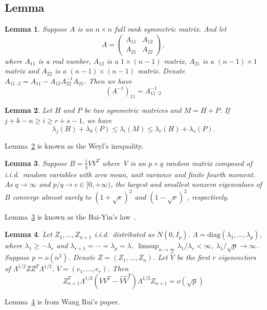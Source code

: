 \documentclass[review]{elsarticle}
\theoremstyle{plain}
\newtheorem{lemma}{Lemma}
\theoremstyle{definition}
\theoremstyle{remark}
\begin{document}
\subsection{Lemma}

\begin{lemma}\label{matrixInv}
    Suppose $A$ is an $n\times n$ full rank symmetric matrix. And let 
    \begin{equation}
        A=\begin{pmatrix}
            A_{11} & A_{12}\\
            A_{21} & A_{22}
        \end{pmatrix},
    \end{equation}
    where $A_{11}$ is a real number, $A_{12}$ is a $1\times (n-1)$ matrix, $A_{21}$ is a $(n-1)\times 1$ matrix and $A_{22}$ is a $(n-1)\times (n-1)$ matrix. Denote $A_{11\cdot 2}=A_{11}-A_{12}A_{22}^{-1}A_{21}$. Then we have
    \begin{equation}
        {(A^{-1})}_{11}=A_{11\cdot 2}^{-1}
    \end{equation}
\end{lemma}

\begin{lemma}\label{Weyl}
Let $H$ and $P$ be two symmetric matrices and $M=H+P$. If $j+k-n\geq i\geq r+s-1$, we have
    \begin{equation}
        \lambda_j (H)+\lambda_k(P)\leq \lambda_i (M)\leq \lambda_r (H)+\lambda_s(P).
    \end{equation}
\end{lemma}
Lemma~\ref{Weyl} is known as the Weyl's inequality.

\begin{lemma}\label{baiyin}
    Suppose $B=\frac{1}{q}V V^T$ where V is an $p\times q$ random matrix composed of i.i.d.\  random variables with zero mean, unit variance and finite fourth moment.
    As $q\to \infty$ and $p/q \to c\in [0,+\infty)$, the largest and smallest nonzero eigenvalues of $B$ converge almost surely to ${(1+\sqrt{c})}^2$ and ${(1-\sqrt{c})}^2$, respectively.
\end{lemma}
Lemma~\ref{baiyin} is known as the Bai-Yin's law~\cite{Bai1993Limit}.

\begin{lemma}\label{wangPCA}
    Let $Z_1,\ldots,Z_{n+1}$ i.i.d.\ distributed as $N(0,I_p)$.
    $\Lambda=\textrm{diag}(\lambda_1,\ldots,\lambda_p)$, where $\lambda_1\geq \cdots \lambda_r$ and $\lambda_{r+1}=\cdots =\lambda_p=\lambda$.
    $\limsup_{n\to \infty} \lambda_1/\lambda_r<\infty$, $\lambda_1/\sqrt{p}\to \infty$.
    Suppose $p=o(n^2)$.
    Denote $Z=(Z_1,\ldots,Z_n)$. Let $\hat{V}$ be the first $r$ eigenvectors of $\Lambda^{1/2}Z Z^T\Lambda^{1/2}$, $V=(e_1,\ldots,e_r)$. Then
    \begin{equation}
        Z_{n+1}^T \Lambda^{1/2}(VV^T -\hat{V}\hat{V}^T)\Lambda^{1/2}Z_{n+1}=o(\sqrt{p})
    \end{equation}
\end{lemma}
Lemma~\ref{wangPCA} is from Wang Rui's paper.
\end{document}
